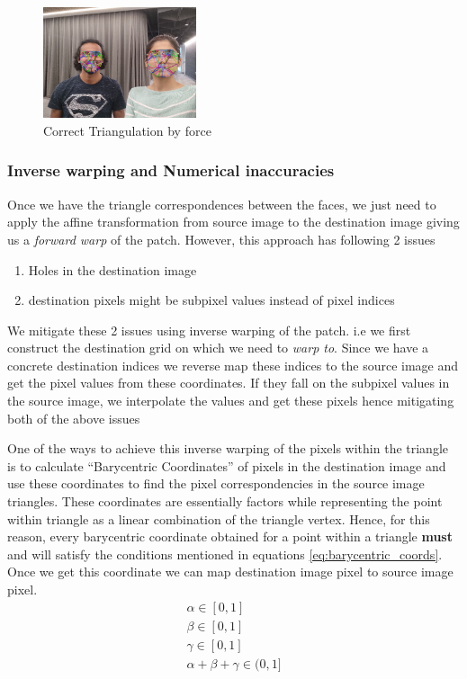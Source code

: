 \documentclass[conference]{IEEEtran}
\begin{document}
\begin{figure}[]
    \centering
    \includegraphics[width=0.4\textwidth]{media/triangulation_solution.png}
    \caption{Correct Triangulation by force}
    \label{fig:triangulation_correct}
\end{figure}


\subsubsection{Inverse warping and Numerical inaccuracies}
Once we have the triangle correspondences between the faces, we just need to apply the affine transformation from source image to the destination image giving us a \textit{forward warp} of the patch. However, this approach has following 2 issues 
\begin{enumerate}
    \item Holes in the destination image
    \item destination pixels might be subpixel values instead of pixel indices
\end{enumerate}
We mitigate these 2 issues using inverse warping of the patch. i.e we first construct the destination grid on which we need to \textit{warp to}. Since we have a concrete destination indices we reverse map these indices to the source image and get the pixel values from these coordinates. If they fall on the subpixel values in the source image, we interpolate the values and get these pixels hence mitigating both of the above issues

One of the ways to achieve this inverse warping of the pixels within the triangle is to calculate ``Barycentric Coordinates'' of pixels in the destination image and use these coordinates to find the pixel correspondencies in the source image triangles. These coordinates are essentially factors while representing the point within triangle as a linear combination of the triangle vertex. Hence, for this reason, every barycentric coordinate obtained for a point within a triangle \textbf{must} and will satisfy the conditions mentioned in equations \ref{eq:barycentric_coords}. Once we get this coordinate we can map destination image pixel to source image pixel. 
\begin{equation}\label{eq:barycentric_coords} 
\begin{aligned}
    \alpha \in [0,1] \\
    \beta \in [0,1]\\
    \gamma \in [0,1]\\
    \alpha + \beta + \gamma \in (0,1]
\end{aligned}
\end{equation}
\end{document}
